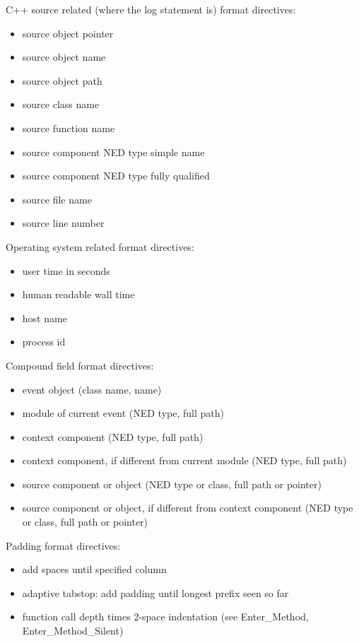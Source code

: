 C++ source related (where the log statement is) format directives:
\begin{itemize}
  \item {} source object pointer
  \item {} source object name
  \item {} source object path
  \item {} source class name
  \item {} source function name
  \item {} source component NED type simple name
  \item {} source component NED type fully qualified
  \item {} source file name
  \item {} source line number
\end{itemize}

Operating system related format directives:
\begin{itemize}
  \item {} user time in seconds
  \item {} human readable wall time
  \item {} host name
  \item {} process id
\end{itemize}

Compound field format directives:
\begin{itemize}
  \item {} event object (class name, name)
  \item {} module of current event (NED type, full path)
  \item {} context component (NED type, full path)
  \item {} context component, if different from current module (NED type, full path)
  \item {} source component or object (NED type or class, full path or pointer)
  \item {} source component or object, if different from context component (NED type or class, full path or pointer)
\end{itemize}

Padding format directives:
\begin{itemize}
  \item \ttt{\%[0-9]+} add spaces until specified column
  \item \ttt{\%|} adaptive tabstop: add padding until longest prefix seen so far
  \item \ttt{\%>} function call depth times 2-space indentation (see Enter\_Method, Enter\_Method\_Silent)
\end{itemize}

